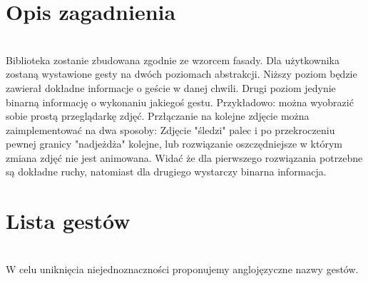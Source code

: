 \documentclass[a4paper,12pt]{article}
\begin{document}
\section{\Large Opis zagadnienia} \ \\[0.1cm]
\indent Biblioteka zostanie zbudowana zgodnie ze wzorcem fasady. Dla użytkownika zostaną wystawione gesty na dwóch poziomach abstrakcji. Niższy poziom będzie zawierał dokładne informacje o geście w danej chwili. Drugi poziom jedynie binarną informację o wykonaniu jakiegoś gestu. Przykładowo: można wyobrazić sobie prostą przeglądarkę zdjęć. Przłączanie na kolejne zdjęcie można zaimplementować na dwa sposoby: Zdjęcie "śledzi" palec i po przekroczeniu pewnej granicy "nadjeżdża" kolejne, lub rozwiązanie oszczędniejsze w którym zmiana zdjęć nie jest animowana. Widać że dla pierwszego rozwiązania potrzebne są dokładne ruchy, natomiast dla drugiego wystarczy binarna informacja.

\section{\Large Lista gestów} \ \\[0.1cm]
\indent W celu uniknięcia niejednoznaczności proponujemy anglojęzyczne nazwy gestów.\\
\end{document}
